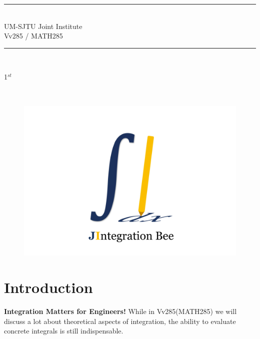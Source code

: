 \documentclass[12pt]{article}
\begin{document}
    \vspace{10cm}
    \begin{center}
        \rule{15cm}{0.01cm}
        \\\LARGE{
            UM-SJTU Joint Institute
            \\Vv285 / MATH285
          }
        \\\rule{15cm}{0.01cm}
        \\\vspace{6cm}
        \begin{Huge}
            1$^{st}$
        \end{Huge}
        \begin{Huge}
            \\
        \end{Huge}
    \end{center}
    \begin{figure}[H]
        \center
        \includegraphics[width = 0.8\linewidth]{Figure/Logo.png}
    \end{figure}
    \vfill
    \flushleft
    \begin{center}
    \end{center}

\setlength{\parindent}{1em}
\newpage
\thispagestyle{empty}
\setcounter{page}{1}

\section{Introduction}
\par \textbf{Integration Matters for Engineers!} While in Vv285(MATH285) we will discuss a lot about theoretical aspects of integration, the ability to evaluate concrete 
integrals is still indispensable. 
\end{document}
